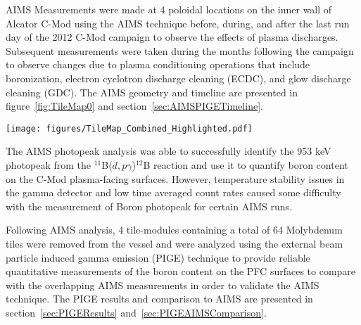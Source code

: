 \documentclass[final,3p,times,twocolumn]{elsarticle}
\begin{document}
AIMS Measurements were made at 4 poloidal locations on the inner wall of Alcator C-Mod using the AIMS technique before, during, and after the last run day of the 2012 C-Mod campaign to observe the effects of plasma discharges. Subsequent measurements were taken during the months following the campaign to observe changes due to plasma conditioning operations that include boronization, electron cyclotron discharge cleaning (ECDC), and glow discharge cleaning (GDC).  The AIMS geometry and timeline are presented in figure~\ref{fig:TileMap0} and section~\ref{sec:AIMSPIGETimeline}.

\begin{figure*}[p]
 \centering
  \texttt{[image: figures/TileMap\_Combined\_Highlighted.pdf]}
 \caption{\small Top: Tile map of the C-Mod inner wall, upper divertor, and lower divertor EF-1 shelf, toroidally spanning the A,B, and C port regions. Bottom: Zoomed-in tile map showing the locations of the PIGE and AIMS measurements. Top Right: Deuteron beam trajectories are shown for four trajectories spanning the range of the AIMS measurements. The tiles highlighted in yellow/red were removed and PIGE analyzed following AIMS measurements.  The green ellipses indicate the calculated location and beamspots for AIMS measurements based on modeling. The filled ellipses represent the four locations used for the majority of the AIMS measurements corresponding to toroidal beam steering fields $B_\phi$ = \{0.000, 0.0582, 0.1135, 0.1618\} Tesla (in order from top to bottom).}
 \label{fig:TileMap0}
\end{figure*}

The AIMS photopeak analysis was able to successfully identify the 953 keV photopeak from the $^{11}$B($d,p\gamma$)$^{12}$B reaction and use it to quantify boron content on the C-Mod plasma-facing surfaces.  However, temperature stability issues in the gamma detector and low time averaged count rates caused some difficulty with the measurement of Boron photopeak for certain AIMS runs.

Following AIMS analysis, 4 tile-modules containing a total of 64 Molybdenum tiles were removed from the vessel and were analyzed using the external beam particle induced gamma emission (PIGE) technique to provide reliable quantitative measurements of the boron content on the PFC surfaces to compare with the overlapping AIMS measurements in order to validate the AIMS technique.  The PIGE results and comparison to AIMS are presented in section~\ref{sec:PIGEResults} and~\ref{sec:PIGEAIMSComparison}.  
\end{document}
